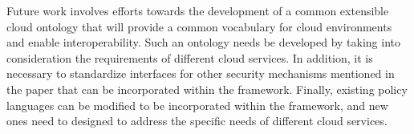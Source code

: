 \documentclass[10pt,letterpaper]{book}
\begin{document}
Future work involves efforts towards the development of a common extensible cloud ontology that will provide a common vocabulary for cloud environments and enable interoperability. Such an ontology needs be developed by taking into consideration the requirements of different cloud services. In addition, it is necessary to standardize interfaces for other security mechanisms mentioned in the paper that can be incorporated within the framework. Finally, existing policy languages can be modified to be incorporated within the framework, and new ones need to designed to address the specific needs of different cloud services. 



\end{document}
